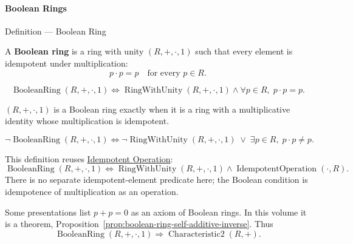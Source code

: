 \paragraph{Boolean Rings}

\begin{definitionbox}{Definition --- Boolean Ring}
\begin{definition}
\label{def:boolean-ring}
A \textbf{Boolean ring} is a ring with unity $(R,+,\cdot,1)$ such that
every element is idempotent under multiplication:
\[
  \tag{B1}
  p\cdot p = p \quad \text{for every } p\in R.
\]
\end{definition}
\end{definitionbox}

\begin{remark*}
\[
\operatorname{BooleanRing}(R,+,\cdot,1)
\Longleftrightarrow
\operatorname{RingWithUnity}(R,+,\cdot,1)
\land
\forall p\in R,\; p\cdot p=p.
\]
\end{remark*}

\begin{remark*}
$(R,+,\cdot,1)$ is a Boolean ring exactly when it is a ring with a
multiplicative identity whose multiplication is idempotent.
\end{remark*}

\begin{remark*}
\[
\neg\operatorname{BooleanRing}(R,+,\cdot,1)
\Longleftrightarrow
\neg\operatorname{RingWithUnity}(R,+,\cdot,1)
\;\lor\;
\exists p\in R,\; p\cdot p\neq p.
\]
\end{remark*}

\begin{remark*}
This definition reuses
\hyperref[def:idempotent-operation]{Idempotent Operation}:
\[
  \operatorname{BooleanRing}(R,+,\cdot,1)
  \Longleftrightarrow
  \operatorname{RingWithUnity}(R,+,\cdot,1)
  \land
  \operatorname{IdempotentOperation}(\cdot,R).
\]
There is no separate idempotent-element predicate here; the Boolean
condition is idempotence of multiplication as an operation.
\end{remark*}

\begin{remark*}
Some presentations list $p+p=0$ as an axiom of Boolean rings. In this
volume it is a theorem, Proposition~\ref{prop:boolean-ring-self-additive-inverse}.
Thus
\[
  \operatorname{BooleanRing}(R,+,\cdot,1)
  \Longrightarrow
  \operatorname{Characteristic2}(R,+).
\]
\end{remark*}

